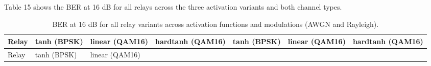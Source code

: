 \documentclass[
  english,
  12pt,
  12pt,
  a4paper,
  oneside]{report}
\begin{document}
Table 15 shows the BER at 16 dB for all relays across the three activation variants and both channel types.

\begin{longtable}[]{@{}
  >{\raggedright\arraybackslash}p{}
  >{\raggedright\arraybackslash}p{}
  >{\raggedright\arraybackslash}p{}
  >{\raggedright\arraybackslash}p{}
  >{\raggedright\arraybackslash}p{}
  >{\raggedright\arraybackslash}p{}
  >{\raggedright\arraybackslash}p{}@{}}
\caption{BER at 16 dB for all relay variants across activation functions and modulations (AWGN and Rayleigh).}\label{tbl:table15}\tabularnewline
\toprule\noalign{}
\begin{minipage}[b]{\linewidth}\raggedright
Relay
\end{minipage} & \begin{minipage}[b]{\linewidth}\raggedright
tanh (BPSK)
\end{minipage} & \begin{minipage}[b]{\linewidth}\raggedright
linear (QAM16)
\end{minipage} & \begin{minipage}[b]{\linewidth}\raggedright
hardtanh (QAM16)
\end{minipage} & \begin{minipage}[b]{\linewidth}\raggedright
tanh (BPSK)
\end{minipage} & \begin{minipage}[b]{\linewidth}\raggedright
linear (QAM16)
\end{minipage} & \begin{minipage}[b]{\linewidth}\raggedright
hardtanh (QAM16)
\end{minipage} \\
\midrule\noalign{}
\endfirsthead
\toprule\noalign{}
\begin{minipage}[b]{\linewidth}\raggedright
Relay
\end{minipage} & \begin{minipage}[b]{\linewidth}\raggedright
tanh (BPSK)
\end{minipage} & \begin{minipage}[b]{\linewidth}\raggedright
linear (QAM16)
\end{minipage} & \begin{minipage}[b]{\linewidth}\raggedright

\end{minipage}
\end{longtable}
\end{document}
